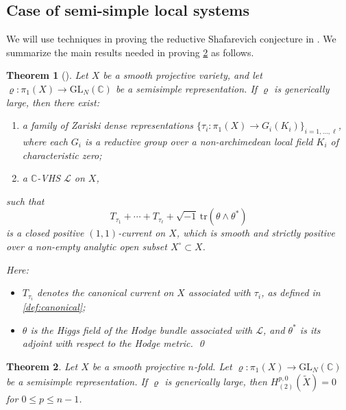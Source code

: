 \documentclass[11pt,a4paper,english]{smfart}
\theoremstyle{plain}
\newtheorem{theorem}{Theorem}[section]
\theoremstyle{definition}
\theoremstyle{plain}
\newcommand\GL{\mathrm{GL}}
\def\bC{\mathbb{C}}
\def\cL{\mathcal{L}}
\begin{document}
	\subsection{Case of semi-simple local systems}\label{subsec:semisimple} 
		We will use   techniques in proving the reductive Shafarevich conjecture in \cite{DY23,Eys04}.  We summarize the main results needed in  proving \cref{thm:main3} as follows. 
	\begin{theorem}[]\label{thm:Sha}
		Let \( X \) be a smooth projective variety, and let \( \varrho: \pi_1(X) \to \GL_N(\bC) \) be a semisimple representation. If \( \varrho \) is generically large, then there exist:
		\begin{enumerate}
			\item a family of Zariski dense representations \( \{\tau_i: \pi_1(X) \to G_i(K_i)\}_{i=1,\ldots,\ell} \), where each \( G_i \) is a reductive group over a non-archimedean local field \( K_i \) of characteristic zero;
			\item a \( \bC \)-VHS \( \cL \) on \( X \),
		\end{enumerate}
		such that
		\[
		T_{\tau_1} + \cdots + T_{\tau_\ell} + \sqrt{-1} \, \mathrm{tr}(\theta \wedge \theta^*)
		\]
		is a closed positive \( (1,1) \)-current on \( X \), which is smooth and strictly positive over a non-empty analytic open subset \( X^\circ \subset X \).
		
		Here:
		\begin{itemize}
			\item \( T_{\tau_i} \) denotes the canonical current on \( X \) associated with \( \tau_i \), as defined in \cref{def:canonical};
			\item \( \theta \) is the Higgs field of the Hodge bundle associated with \( \cL \), and \( \theta^* \) is its adjoint with respect to the Hodge metric. \qed
		\end{itemize}
	\end{theorem}
	\begin{theorem}\label{thm:main3}
		Let $X$ be a smooth projective $n$-fold. Let $\varrho:\pi_1(X)\to \GL_N(\bC)$ be a semisimple representation. 
  If $\varrho$ is  generically large,  then  
 $H^{p,0}_{(2)}(\widetilde{X})=0$   for  $0\leq p\leq n-1$.
	\end{theorem} 
\end{document}
